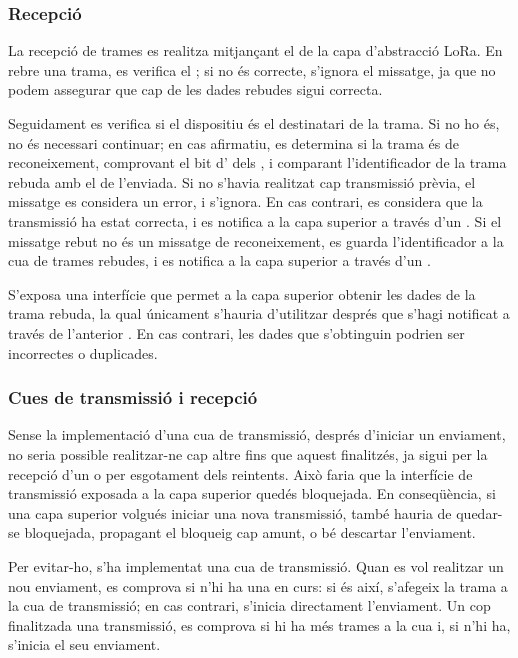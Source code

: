 \documentclass{tfgitic}[2024/07/01]
\begin{document}
\subsubsection{Recepció}
La recepció de trames es realitza mitjançant el  de la capa d'abstracció LoRa. En rebre una trama, es verifica el ; si no és correcte, s'ignora el missatge, ja que no podem assegurar que cap de les dades rebudes sigui correcta.

Seguidament es verifica si el dispositiu és el destinatari de la trama. Si no ho és, no és necessari continuar; en cas afirmatiu, es determina si la trama és de reconeixement, comprovant el bit d' dels , i comparant l'identificador de la trama rebuda amb el de l'enviada. Si no s'havia realitzat cap transmissió prèvia, el missatge es considera un error, i s'ignora. En cas contrari, es considera que la transmissió ha estat correcta, i es notifica a la capa superior a través d'un . Si el missatge rebut no és un missatge de reconeixement, es guarda l'identificador a la cua de trames rebudes, i es notifica a la capa superior a través d'un .

S'exposa una interfície que permet a la capa superior obtenir les dades de la trama rebuda, la qual únicament s'hauria d'utilitzar després que s'hagi notificat a través de l'anterior . En cas contrari, les dades que s'obtinguin podrien ser incorrectes o duplicades.
\subsubsection{Cues de transmissió i recepció}
Sense la implementació d'una cua de transmissió, després d'iniciar un enviament, no seria possible realitzar-ne cap altre fins que aquest finalitzés, ja sigui per la recepció d'un  o per esgotament dels reintents. Això faria que la interfície de transmissió exposada a la capa superior quedés bloquejada. En conseqüència, si una capa superior volgués iniciar una nova transmissió, també hauria de quedar-se bloquejada, propagant el bloqueig cap amunt, o bé descartar l'enviament.

Per evitar-ho, s'ha implementat una cua de transmissió. Quan es vol realitzar un nou enviament, es comprova si n'hi ha una en curs: si és així, s'afegeix la trama a la cua de transmissió; en cas contrari, s'inicia directament l'enviament. Un cop finalitzada una transmissió, es comprova si hi ha més trames a la cua i, si n'hi ha, s'inicia el seu enviament.
\end{document}
